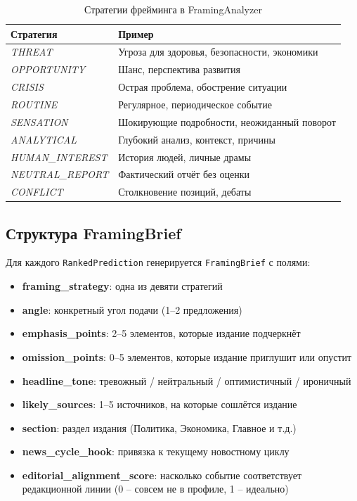 \begin{table}[h]
  \centering
  \caption{Стратегии фрейминга в FramingAnalyzer}
  \label{tab:framing-strategies}
  \begin{tabular}{|l|l|}
    \hline
    \textbf{Стратегия} & \textbf{Пример} \\
    \hline
    \emph{THREAT} & Угроза для здоровья, безопасности, экономики \\
    \hline
    \emph{OPPORTUNITY} & Шанс, перспектива развития \\
    \hline
    \emph{CRISIS} & Острая проблема, обострение ситуации \\
    \hline
    \emph{ROUTINE} & Регулярное, периодическое событие \\
    \hline
    \emph{SENSATION} & Шокирующие подробности, неожиданный поворот \\
    \hline
    \emph{ANALYTICAL} & Глубокий анализ, контекст, причины \\
    \hline
    \emph{HUMAN\_INTEREST} & История людей, личные драмы \\
    \hline
    \emph{NEUTRAL\_REPORT} & Фактический отчёт без оценки \\
    \hline
    \emph{CONFLICT} & Столкновение позиций, дебаты \\
    \hline
  \end{tabular}
\end{table}

\subsection{Структура FramingBrief}

Для каждого \verb|RankedPrediction| генерируется \verb|FramingBrief| с полями:

\begin{itemize}
  \item \textbf{framing\_strategy}: одна из девяти стратегий
  \item \textbf{angle}: конкретный угол подачи (1--2 предложения)
  \item \textbf{emphasis\_points}: 2--5 элементов, которые издание подчеркнёт
  \item \textbf{omission\_points}: 0--5 элементов, которые издание приглушит или опустит
  \item \textbf{headline\_tone}: тревожный / нейтральный / оптимистичный / ироничный
  \item \textbf{likely\_sources}: 1--5 источников, на которые сошлётся издание
  \item \textbf{section}: раздел издания (Политика, Экономика, Главное и т.д.)
  \item \textbf{news\_cycle\_hook}: привязка к текущему новостному циклу
  \item \textbf{editorial\_alignment\_score}: насколько событие соответствует редакционной линии (0 -- совсем не в профиле, 1 -- идеально)
\end{itemize}

